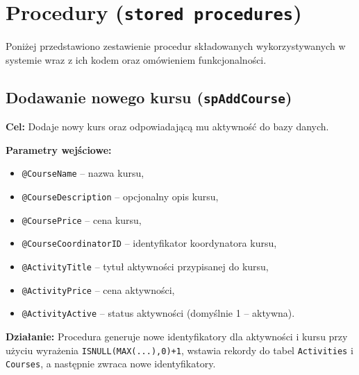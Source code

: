 \documentclass[12pt]{article}
\begin{document}

\newpage
\section{Procedury (\texttt{stored procedures})}
Poniżej przedstawiono zestawienie procedur składowanych wykorzystywanych w systemie wraz z ich kodem oraz omówieniem funkcjonalności.

\subsection{Dodawanie nowego kursu (\texttt{spAddCourse})}
\textbf{Cel:} Dodaje nowy kurs oraz odpowiadającą mu aktywność do bazy danych.

\textbf{Parametry wejściowe:}
\begin{itemize}
  \item \texttt{@CourseName} – nazwa kursu,
  \item \texttt{@CourseDescription} – opcjonalny opis kursu,
  \item \texttt{@CoursePrice} – cena kursu,
  \item \texttt{@CourseCoordinatorID} – identyfikator koordynatora kursu,
  \item \texttt{@ActivityTitle} – tytuł aktywności przypisanej do kursu,
  \item \texttt{@ActivityPrice} – cena aktywności,
  \item \texttt{@ActivityActive} – status aktywności (domyślnie 1 – aktywna).
\end{itemize}

\textbf{Działanie:} Procedura generuje nowe identyfikatory dla aktywności i kursu przy użyciu wyrażenia \verb|ISNULL(MAX(...),0)+1|, wstawia rekordy do tabel \verb|Activities| i \verb|Courses|, a następnie zwraca nowe identyfikatory.
\end{document}
